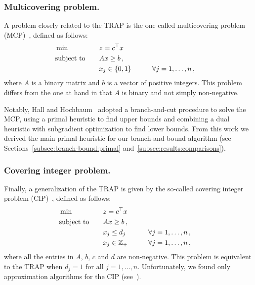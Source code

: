 \documentclass[runningheads]{llncs}
\begin{document}
\subsubsection{Multicovering problem.} A problem closely related to the TRAP is the one called multicovering problem (MCP)~\cite{hall-hochbaum-1986-fast-approximation, hall-hochbaum-1992-multicovering}, defined as follows:
\begin{alignat}{3}
  &\min & \quad & z = c^\top x \notag\\
  &\text{subject to}  &       & Ax \ge b \, , \notag\\
  &                   &       & x_j \in \{0, 1\}  & \qquad & \forall j=1,\dots,n \, , \notag
\end{alignat}
where $A$ is a binary matrix and $b$ is a vector of positive integers. This problem differs from the one at hand in that $A$ is binary and not simply non-negative.

Notably, Hall and Hochbaum~\cite{hall-hochbaum-1992-multicovering} adopted a branch-and-cut procedure to solve the MCP, using a primal heuristic to find upper bounds and combining a dual heuristic with subgradient optimization to find lower bounds. From this work we derived the main primal heuristic for our branch-and-bound algorithm (see Sections~\ref{subsec:branch-bound:primal} and~\ref{subsec:results:comparisons}). 

\subsubsection{Covering integer problem.} Finally, a generalization of the TRAP is given by the so-called covering integer problem (CIP)~\cite{kolliopoulos-2003-approximating,kolliopoulos-2005-approximation}, defined as follows:
\begin{alignat}{3}
  &\min & \quad & z = c^\top x \notag\\
  &\text{subject to}  &       & Ax \ge b \, , \notag\\
  &                   &       & x_j \le d_j & \qquad & \forall j=1,\dots,n \, , \notag\\
  &                   &       & x_j \in \mathbb{Z}_{+}  & \qquad &  \forall j=1,\dots,n \, , \notag
\end{alignat}
where all the entries in $A$, $b$, $c$ and $d$ are non-negative. This problem is equivalent to the TRAP when $d_j = 1$ for all $j=1,\dots,n$. Unfortunately, we found only approximation algorithms for the CIP (see~\cite{kolliopoulos-2003-approximating,kolliopoulos-2005-approximation}).
\end{document}
